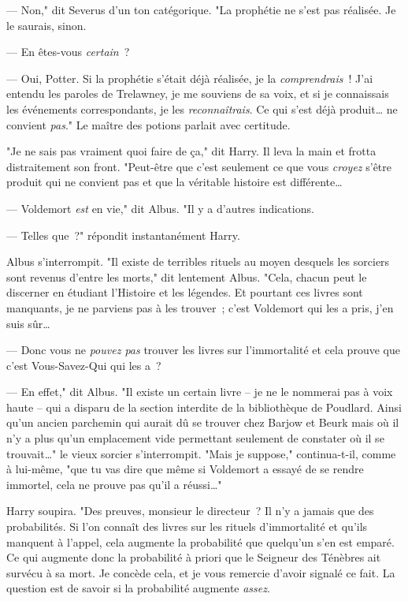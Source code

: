 --- Non," dit Severus d'un ton catégorique. "La prophétie ne s'est pas réalisée. Je le saurais, sinon.

--- En êtes-vous \emph{certain}~?

--- Oui, Potter. Si la prophétie s'était déjà réalisée, je la \emph{comprendrais}~! J'ai entendu les paroles de Trelawney, je me souviens de sa voix, et si je connaissais les événements correspondants, je les \emph{reconnaîtrais}. Ce qui s'est déjà produit… ne convient \emph{pas}." Le maître des potions parlait avec certitude.

"Je ne sais pas vraiment quoi faire de ça," dit Harry. Il leva la main et frotta distraitement son front. "Peut-être que c'est seulement ce que vous \emph{croyez} s'être produit qui ne convient pas et que la véritable histoire est différente…

--- Voldemort \emph{est} en vie," dit Albus. "Il y a d'autres indications.

--- Telles que~?" répondit instantanément Harry.

Albus s'interrompit. "Il existe de terribles rituels au moyen desquels les sorciers sont revenus d'entre les morts," dit lentement Albus. "Cela, chacun peut le discerner en étudiant l'Histoire et les légendes. Et pourtant ces livres sont manquants, je ne parviens pas à les trouver~; c'est Voldemort qui les a pris, j'en suis sûr…

--- Donc vous ne \emph{pouvez pas} trouver les livres sur l'immortalité et cela prouve que c'est Vous-Savez-Qui qui les a~?

--- En effet," dit Albus. "Il existe un certain livre -- je ne le nommerai pas à voix haute -- qui a disparu de la section interdite de la bibliothèque de Poudlard. Ainsi qu'un ancien parchemin qui aurait dû se trouver chez Barjow et Beurk mais où il n'y a plus qu'un emplacement vide permettant seulement de constater où il se trouvait…" le vieux sorcier s'interrompit. "Mais je suppose," continua-t-il, comme à lui-même, "que tu vas dire que même si Voldemort a essayé de se rendre immortel, cela ne prouve pas qu'il a réussi…"

Harry soupira. "Des preuves, monsieur le directeur~? Il n'y a jamais que des probabilités. Si l'on connaît des livres sur les rituels d'immortalité et qu'ils manquent à l'appel, cela augmente la probabilité que quelqu'un s'en est emparé. Ce qui augmente donc la probabilité à priori que le Seigneur des Ténèbres ait survécu à sa mort. Je concède cela, et je vous remercie d'avoir signalé ce fait. La question est de savoir si la probabilité augmente \emph{assez}.

